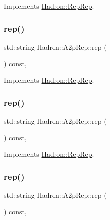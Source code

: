 Implements \mbox{\hyperlink{structHadron_1_1RepRep_ab3213025f6de249f7095892109575fde}{Hadron\+::\+Rep\+Rep}}.

\mbox{\label{structHadron_1_1A2pRep_a3ced5497d56bb36345560c2e3cb3d2e7}} 
\subsubsection{\texorpdfstring{rep()}{rep()}\hspace{0.1cm}{\footnotesize\ttfamily [3/5]}}
{\footnotesize\ttfamily std\+::string Hadron\+::\+A2p\+Rep\+::rep (\begin{DoxyParamCaption}{ }\end{DoxyParamCaption}) const\hspace{0.3cm}{\ttfamily [inline]}, {\ttfamily [virtual]}}



Implements \mbox{\hyperlink{structHadron_1_1RepRep_ab3213025f6de249f7095892109575fde}{Hadron\+::\+Rep\+Rep}}.

\mbox{\label{structHadron_1_1A2pRep_a3ced5497d56bb36345560c2e3cb3d2e7}} 
\subsubsection{\texorpdfstring{rep()}{rep()}\hspace{0.1cm}{\footnotesize\ttfamily [4/5]}}
{\footnotesize\ttfamily std\+::string Hadron\+::\+A2p\+Rep\+::rep (\begin{DoxyParamCaption}{ }\end{DoxyParamCaption}) const\hspace{0.3cm}{\ttfamily [inline]}, {\ttfamily [virtual]}}



Implements \mbox{\hyperlink{structHadron_1_1RepRep_ab3213025f6de249f7095892109575fde}{Hadron\+::\+Rep\+Rep}}.

\mbox{\label{structHadron_1_1A2pRep_a3ced5497d56bb36345560c2e3cb3d2e7}} 
\subsubsection{\texorpdfstring{rep()}{rep()}\hspace{0.1cm}{\footnotesize\ttfamily [5/5]}}
{\footnotesize\ttfamily std\+::string Hadron\+::\+A2p\+Rep\+::rep (\begin{DoxyParamCaption}{ }\end{DoxyParamCaption}) const\hspace{0.3cm}{\ttfamily [inline]}, {\ttfamily [virtual]}}



